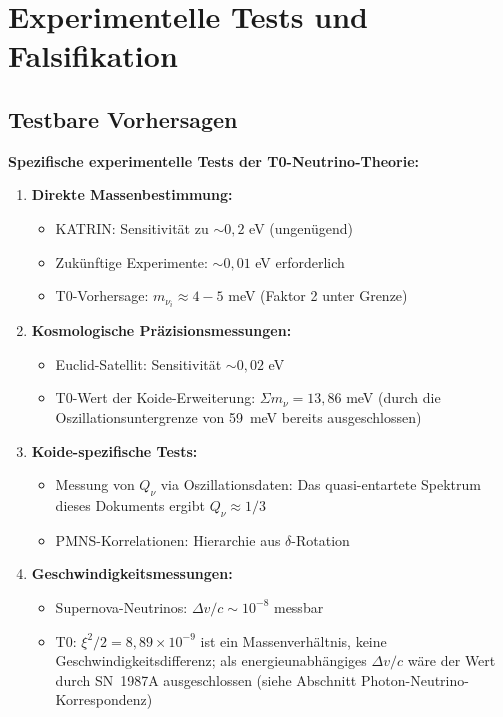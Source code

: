 	\section{Experimentelle Tests und Falsifikation}
	
	\subsection{Testbare Vorhersagen}
	
	\begin{experimental}
		\textbf{Spezifische experimentelle Tests der T0-Neutrino-Theorie:}
		
		\begin{enumerate}
			\item \textbf{Direkte Massenbestimmung:}
			\begin{itemize}
				\item KATRIN: Sensitivität zu $\sim 0,2$ eV (ungenügend)
				\item Zukünftige Experimente: $\sim 0,01$ eV erforderlich
				\item T0-Vorhersage: $m_{\nu_i} \approx 4-5$ meV (Faktor 2 unter Grenze)
			\end{itemize}
			
			\item \textbf{Kosmologische Präzisionsmessungen:}
			\begin{itemize}
				\item Euclid-Satellit: Sensitivität $\sim 0,02$ eV
				\item T0-Wert der Koide-Erweiterung: $\Sigma m_\nu = 13,86$ meV (durch die Oszillationsuntergrenze von 59~meV bereits ausgeschlossen)
			\end{itemize}
			
			\item \textbf{Koide-spezifische Tests:}
			\begin{itemize}
				\item Messung von $Q_\nu$ via Oszillationsdaten: Das quasi-entartete Spektrum dieses Dokuments ergibt $Q_\nu \approx 1/3$
				\item PMNS-Korrelationen: Hierarchie aus $\delta$-Rotation
			\end{itemize}
			
			\item \textbf{Geschwindigkeitsmessungen:}
			\begin{itemize}
				\item Supernova-Neutrinos: $\Delta v/c \sim 10^{-8}$ messbar
				\item T0: $\xi^2/2 = 8,89 \times 10^{-9}$ ist ein Massenverhältnis, keine Geschwindigkeitsdifferenz; als energieunabhängiges $\Delta v/c$ wäre der Wert durch SN~1987A ausgeschlossen (siehe Abschnitt Photon-Neutrino-Korrespondenz)
			\end{itemize}
			

\end{enumerate}
\end{experimental}
